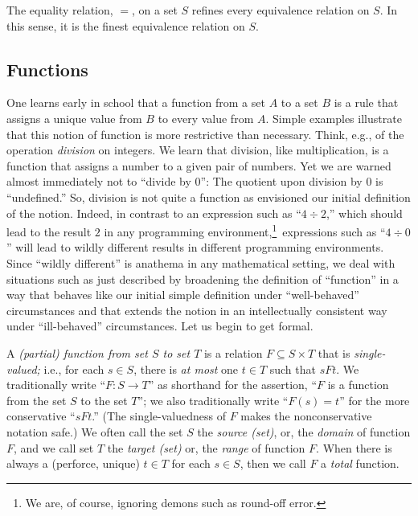 \begin{theorem}
\label{thm:equality=finest-equiv}
The equality relation, $=$, on a set $S$ refines every equivalence
relation on $S$.  In this sense, it is the finest equivalence relation
on $S$.
\end{theorem}

\subsection{Functions}
\label{sec:function}

One learns early in school that a function from a set $A$ to a set $B$
is a rule that assigns a unique value from $B$ to every value from
$A$.  Simple examples illustrate that this notion of function is more
restrictive than necessary.  Think, e.g., of the operation {\em
  division} on integers.  We learn that division, like multiplication,
is a function that assigns a number to a given pair of numbers.  Yet
we are warned almost immediately not to ``divide by $0$'': The
quotient upon division by $0$ is ``undefined.''  So, division is not
quite a function as envisioned our initial definition of the notion.
Indeed, in contrast to an expression such as ``$4 \div 2$,'' which
should lead to the result $2$ in any programming
environment,\footnote{We are, of course, ignoring demons such as
  round-off error.}~expressions such as ``$4 \div 0$'' will lead to
wildly different results in different programming environments.  Since
``wildly different'' is anathema in any mathematical setting, we deal
with situations such as just described by broadening the definition of
``function'' in a way that behaves like our initial simple definition
under ``well-behaved'' circumstances and that extends the notion in an
intellectually consistent way under ``ill-behaved'' circumstances.
Let us begin to get formal.

A {\it (partial) function from set $S$ to set $T$} is a relation $F
\subseteq S \times T$ that is {\it single-valued;} i.e., for each $s
\in S$, there is {\em at most} one $t \in T$ such that $sFt$.  We
traditionally write ``$F: S \rightarrow T$'' as shorthand for the
assertion, ``$F$ is a function from the set $S$ to the set $T$''; we
also traditionally write ``$F(s) = t$'' for the more conservative
``$sFt$.''  (The single-valuedness of $F$ makes the nonconservative
notation safe.)  We often call the set $S$ the {\em source (set)},
or, the {\it domain}
%
of function $F$, and we call set $T$ the {\em target (set)}
or, the {\it range}
%
of function $F$.  When there is always a (perforce, unique) $t \in T$
for each $s \in S$, then we call $F$ a {\em total} function.


